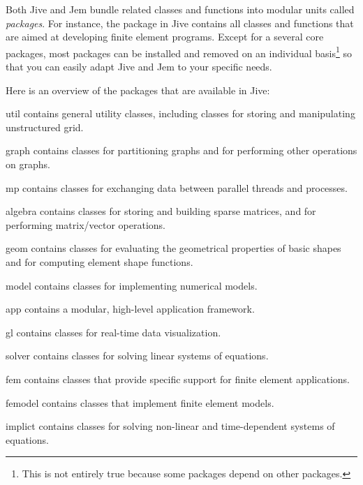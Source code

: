 Both Jive and Jem bundle related classes and functions into modular units
called \emph{packages}. For instance, the  package in Jive
contains all classes and functions that are aimed at developing finite
element programs. Except for a several core packages, most packages can
be installed and removed on an individual basis\footnote{This is not
entirely true because some packages depend on other packages.} so that
you can easily adapt Jive and Jem to your specific needs.

Here is an overview of the packages that are available in Jive:
\begin{Description}[\Code]

\item[util]    contains general utility classes, including classes for
  storing and manipulating unstructured grid.

\item[graph]   contains classes for partitioning graphs and for
  performing other operations on graphs.

\item[mp]      contains classes for exchanging data between parallel
  threads and processes.

\item[algebra] contains classes for storing and building sparse matrices,
  and for performing matrix/vector operations.

\item[geom]    contains classes for evaluating the geometrical properties
  of basic shapes and for computing element shape functions.

\item[model]   contains classes for implementing numerical models.

\item[app]     contains a modular, high-level application framework.

\item[gl]      contains classes for real-time data visualization.

\item[solver]  contains classes for solving linear systems of
  equations.

\item[fem]     contains classes that provide specific support for finite
  element applications.

\item[femodel] contains classes that implement finite element models.

\item[implict] contains classes for solving non-linear and time-dependent
  systems of equations.

\end{Description}

